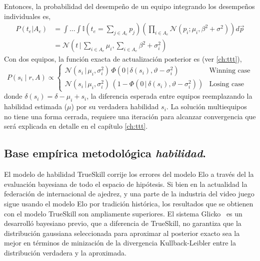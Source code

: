 \documentclass[a4paper,11pt]{book}
\newcommand{\N}{\mathcal{N}}
\theoremstyle{definition}
\begin{document}
Entonces, la probabilidad del desempe\~no de un equipo integrando los desempe\~nos individuales es,
\begin{align}
 P(t_e|A_e) &= \int \dots \int \mathbb{I}(t_e = \sum_{j\in A_e } p_j ) \left(\prod_{i \in A_e} \N(p_i;\mu_i,\beta^2 + \sigma^2) \right) d\vec{p} \\
 & = \N\left(t\,|\,\sum_{i\in A_e} \mu_i,\sum_{i\in A_e} \beta^2 + \sigma_i^2\right)
\end{align}
%
Con dos equipos, la funci\'on exacta de actualizaci\'on posterior es (ver \ref{ch:ttt}),
%
\begin{equation}
 P(s_i \mid r, A) \propto
 \begin{cases}
  \N(s_i \, | \, \mu_i, \sigma_i^2) \, \Phi(0 \, | \, \delta(s_i), \vartheta - \sigma_i^2) & \text{Winning case} \\
  \N(s_i \, | \, \mu_i, \sigma_i^2 ) \, (1 - \Phi(0 \, | \, \delta(s_i), \vartheta - \sigma_i^2)) & \text{Losing case}
 \end{cases}
\end{equation}
%
donde $\delta(s_i) = \delta - \mu_i + s_i$, la diferencia esperada entre equipos reemplazando la habilidad estimada ($\mu$) por su verdadera habilidad $s_i$.
%
La soluci\'on multiequipos no tiene una forma cerrada, requiere una iteraci\'on para alcanzar convergencia que ser\'a explicada en detalle en el cap\'itulo \ref{ch:ttt}.

\subsection{Base emp\'irica metodol\'ogica \emph{habilidad}.}

El modelo de habilidad TrueSkill corrije los errores del modelo Elo a trav\'es del la evaluaci\'on bayesiana de todo el espacio de hip\'otesis.
%
Si bien en la actualidad la federaci\'on de internacional de ajedrez, y una parte de la industria del video juego sigue usando el modelo Elo por tradici\'on hist\'orica, los resultados que se obtienen con el modelo TrueSkill son ampliamente superiores.
%
El sistema Glicko~\cite{Glikman2013} es un desarroll\'o bayesiano previo, que a diferencia de TrueSkill, no garantiza que la distribuci\'on gaussiana seleccionada para aproximar al posterior exacto sea la mejor en t\'erminos de minizaci\'on de la divergencia Kullback-Leibler entre la distribuci\'on verdadera y la aproximada.

\end{document}
